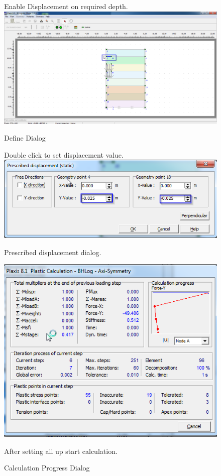 \begin{landscape}
\begin{figure}[hbtp]
  \vfill
  \centering
  \begin{minipage}[c]{0.35\linewidth}
    \vfill
	Enable Displacement on required depth.
    \includegraphics[width=\linewidth, height=0.7\textheight,keepaspectratio]{images/plx/a (18).png}
    \caption{Define Dialog}
    \vfill
	Double click to set displacement value.
    \includegraphics[width=\linewidth, height=0.3\textheight,keepaspectratio]{images/plx/a (19).png}
    \caption{Prescribed displacement dialog.}
    \vfill
  \end{minipage}
  \hfill
  \begin{minipage}[c]{0.6\linewidth}
  \includegraphics[width=\linewidth, height=0.8\textheight,keepaspectratio]{images/plx/a (20).png}
  \caption{Calculation Progress Dialog}
  After setting all up start calculation.
  \end{minipage}
\vfill
\end{figure}
\end{landscape}
\pagebreak

